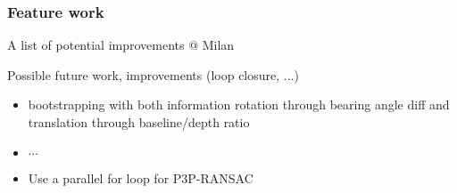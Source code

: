 \subsubsection{Feature work}
A list of potential improvements
\textcolor[rgb]{1,0,0}{@ Milan}

Possible future work, improvements (loop closure, ...)

\begin{itemize}
\item bootstrapping with both information rotation through bearing angle diff and translation through baseline/depth ratio
\item $\cdots$
\item Use a parallel for loop for P3P-RANSAC
\end{itemize}

